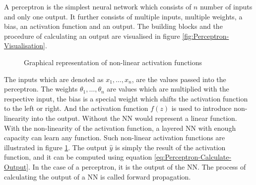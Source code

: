 \newline
\newline
A perceptron is the simplest neural network which consists of $n$ number of inputs and only one output. It further consists of multiple inputs, multiple weights, a bias, an activation function and an output. The building blocks and the procedure of calculating an output are visualised in figure \ref{fig:Perceptron-Visualisation}.

\begin{figure}[htbp]
    \centering
    \caption{Graphical representation of non-linear activation functions}
    \label{fig:Activation-Functions}
\end{figure}
\noindent
The inputs which are denoted as $x_1, \dots, x_n$, are the values passed into the perceptron. The weights $\theta_{1}, \dots, \theta_{n}$ are values which are multiplied with the respective input, the bias is a special weight which shifts the activation function to the left or right. And the activation function $f(z)$ is used to introduce non-linearity into the output. Without the \gls{NN} would represent a linear function. With the non-linearity of the activation function, a layered \gls{NN} with enough capacity can learn any function. Such non-linear activation functions are illustrated in figure \ref{fig:Activation-Functions}. The output $\hat{y}$ is simply the result of the activation function, and it can be computed using equation \ref{eq:Perceptron-Calculate-Output}. In the case of a perceptron, it is the output of the \gls{NN}. The process of calculating the output of a \gls{NN} is called forward propagation.
